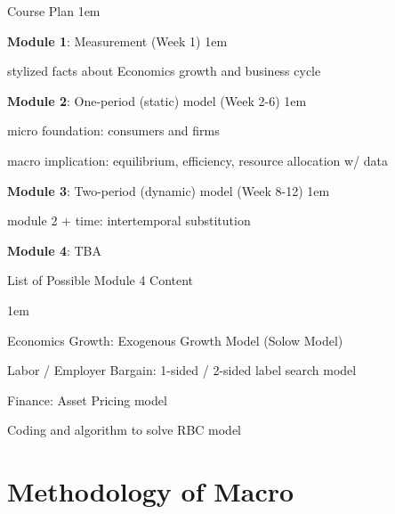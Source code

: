 \documentclass[11pt,aspectratio=43]{beamer}
\let\olditemize=\itemize
\let\endolditemize=\enditemize
\renewenvironment{itemize}{\olditemize \itemsep1em}{\endolditemize}
\theoremstyle{definition}
\begin{document}
\begin{frame}{Course Plan}
\label{slide:Course_Plan}
\begin{itemize}
    \item \textbf{Module 1}: Measurement (Week 1)
    \begin{itemize}
        \item stylized facts about Economics growth and business cycle
    \end{itemize}
    \item \textbf{Module 2}: One-period (\alert{static}) model (Week 2-6)
    \begin{itemize}
        \item micro foundation: consumers and firms
        \item macro implication: equilibrium, efficiency, resource allocation w/ data
    \end{itemize}
    \item \textbf{Module 3}: Two-period (\alert{dynamic}) model (Week 8-12)
    \begin{itemize}
        \item module 2 $ + $ time: \alert{intertemporal substitution}
    \end{itemize}
    \item \textbf{Module 4}: TBA
\end{itemize}
\end{frame}

\begin{frame}{List of Possible Module 4 Content}
\label{slide:List_of_Possible_Module_4_Content}

    \begin{itemize}
        \item Economics Growth: Exogenous Growth Model (Solow Model)
        \item Labor / Employer Bargain: 1-sided / 2-sided label search model
        \item Finance: Asset Pricing model
        \item Coding and algorithm to solve RBC model
    \end{itemize}

\end{frame}


\section{Methodology of Macro}
\label{sec:Methodology_of_Macro}
\end{document}
